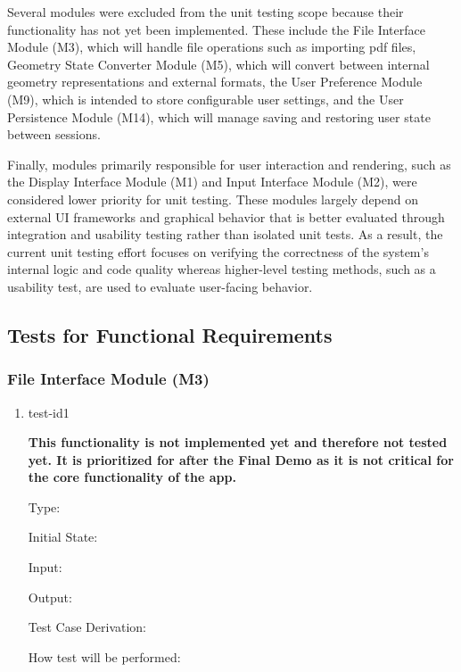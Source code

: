 \documentclass[12pt, titlepage]{article}
\begin{document}
Several modules were excluded from the unit testing scope because their functionality has
not yet been implemented. These include the File Interface Module (M3), which will
handle file operations such as importing pdf files, Geometry State Converter Module (M5),
which will convert between internal geometry representations and external formats, the User
Preference Module (M9), which is intended to store configurable user settings, and the
User Persistence Module (M14), which will manage saving and restoring user state
between sessions.

Finally, modules primarily responsible for user interaction and rendering, such as the
Display Interface Module (M1) and Input Interface Module (M2), were considered lower
priority for unit testing. These modules largely depend on external UI frameworks and
graphical behavior that is better evaluated through integration and usability testing
rather than isolated unit tests. As a result, the current unit testing effort focuses on
verifying the correctness of the system's internal logic and code quality whereas
higher-level testing methods, such as a usability test, are used to evaluate user-facing
behavior.

\subsection{Tests for Functional Requirements}


\subsubsection{File Interface Module (M3)}


\begin{enumerate}

\item{test-id1\\}

\textbf{This functionality is not implemented yet and therefore not tested yet. It is 
prioritized for after the Final Demo as it is not critical for the core functionality of the app.}

Type:

Initial State:

Input:

Output:

Test Case Derivation:

How test will be performed:

\end{enumerate}
\end{document}
